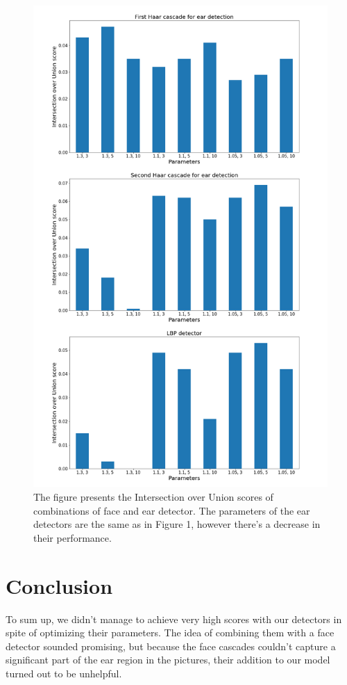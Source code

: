 \documentclass[9pt]{IEEEtran}
\begin{document}
\begin{figure}[h]
    \centering
    \includegraphics[width=1\columnwidth]{plot_2.2}
    \caption{The figure presents the Intersection over Union scores of combinations of face and ear detector. The parameters of the ear detectors are the same as in Figure 1, however there's a decrease in their performance.}
    \label{fig:plot_2.2}
\end{figure}

\section{Conclusion}
To sum up, we didn't manage to achieve very high scores with our detectors in spite of optimizing their parameters. The idea of combining them with a face detector sounded promising, but because the face cascades couldn't capture a significant part of the ear region in the pictures, their addition to our model turned out to be unhelpful. 
\end{document}
